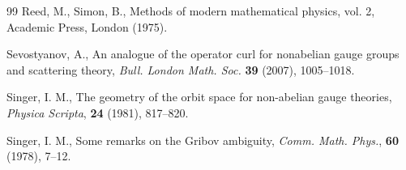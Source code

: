 \documentclass{amsart}
\begin{document}
\begin{thebibliography}{99}
 Reed, M., Simon, B., Methods of modern mathematical physics,
vol. 2, Academic Press, London (1975).


 Sevostyanov, A., An analogue of the operator curl for nonabelian gauge groups and scattering theory, {\em Bull. London Math. Soc.} {\bf 39} (2007), 1005--1018.

 Singer, I. M., The geometry of the orbit space for
non-abelian gauge theories, {\em Physica Scripta}, {\bf 24} (1981),
817--820.

 Singer, I. M., Some remarks on the Gribov ambiguity, {\em Comm. Math. Phys.}, {\bf 60} (1978), 7--12.

\end{thebibliography}
\end{document}
